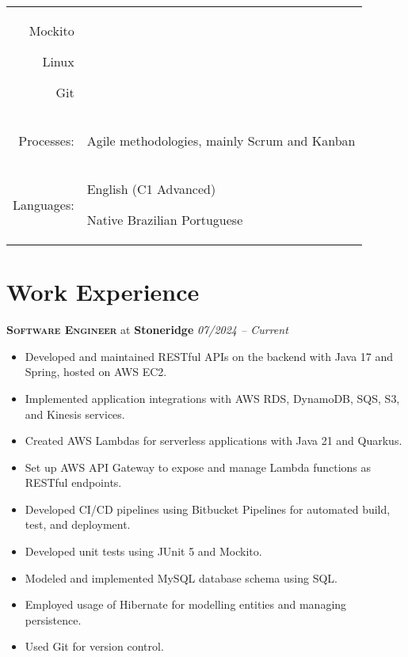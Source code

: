 \documentclass[a4paper,12pt]{article}
\begin{document}
\begin{tabular}{rp{15.2cm}}
\begin{itemize*}[label=\Large\textbullet]
    \item Mockito
    \item Linux
    \item Git
\end{itemize*}\\
\raggedleft Processes:
& \begin{itemize*}[label=\Large\textbullet]
    \item Agile methodologies, mainly Scrum and Kanban
\end{itemize*}\\
\raggedleft Languages:
& \begin{itemize*}[label=\Large\textbullet]
    \item English (C1 Advanced)
    \item Native Brazilian Portuguese
\end{itemize*}\\
\end{tabular}

\section{Work Experience}

\vspace{8pt}

\textbf{\textsc{Software Engineer}} at \textbf{Stoneridge} \hfill \textit{07/2024 -- Current}

{\small
\begin{itemize}[leftmargin=*,label=\large\textbullet]
    \setlength\itemsep{-0.2em}
    \item Developed and maintained RESTful APIs on the backend with Java 17 and Spring, hosted on AWS EC2.
    \item Implemented application integrations with AWS RDS, DynamoDB, SQS, S3, and Kinesis services.
    \item Created AWS Lambdas for serverless applications with Java 21 and Quarkus.
    \item Set up AWS API Gateway to expose and manage Lambda functions as RESTful endpoints.
    \item Developed CI/CD pipelines using Bitbucket Pipelines for automated build, test, and deployment.
    \item Developed unit tests using JUnit 5 and Mockito.
    \item Modeled and implemented MySQL database schema using SQL.
    \item Employed usage of Hibernate for modelling entities and managing persistence.
    \item Used Git for version control.
\end{itemize}
}
\end{document}
